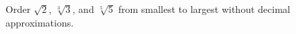 Order $\sqrt2$, $\sqrt[3]3$, and $\sqrt[5]5$ from smallest to largest without decimal approximations.
